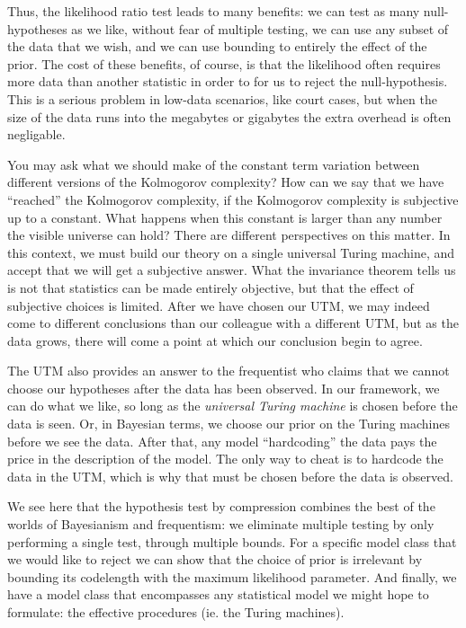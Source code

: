 
Thus, the likelihood ratio test leads to many benefits: we can test as many null-hypotheses as we like, without fear of multiple testing, we can use any subset of the data that we wish, and we can use bounding to entirely the effect of the prior.  The cost of these benefits, of course, is that the likelihood often requires more data than another statistic in order to for us to reject the null-hypothesis. This is a serious problem in low-data scenarios, like court cases, but when the size of the data runs into the megabytes or gigabytes the extra overhead is often negligable.

You may ask what we should make of the constant term variation between different versions of the Kolmogorov complexity? How can we say that we have ``reached'' the Kolmogorov complexity, if the Kolmogorov complexity is subjective up to a constant. What happens when this constant is larger than any number the visible universe can hold? There are different perspectives on this matter. In this context, we must build our theory on a single universal Turing machine, and accept that we will get a subjective answer. What the invariance theorem tells us is not that statistics can be made entirely objective, but that the effect of subjective choices is limited. After we have chosen our UTM, we may indeed come to different conclusions than our colleague with a different UTM, but as the data grows, there will come a point at which our conclusion begin to agree.

The UTM also provides an answer to the frequentist who claims that we cannot choose our hypotheses after the data has been observed. In our framework, we can do what we like, so long as the \emph{universal Turing machine} is chosen before the data is seen. Or, in Bayesian terms, we choose our prior on the Turing machines before we see the data. After that, any model ``hardcoding'' the data pays the price in the description of the model. The only way to cheat is to hardcode the data in the UTM, which is why that must be chosen before the data is observed.

We see here that the hypothesis test by compression combines the best of the worlds of Bayesianism and frequentism: we eliminate multiple testing by only performing a single test, through multiple bounds. For a specific model class that we would like to reject we can show that the choice of prior is irrelevant by bounding its codelength with the maximum likelihood parameter. And finally, we have a model class that encompasses any statistical model we might hope to formulate: the effective procedures (ie. the Turing machines). 

